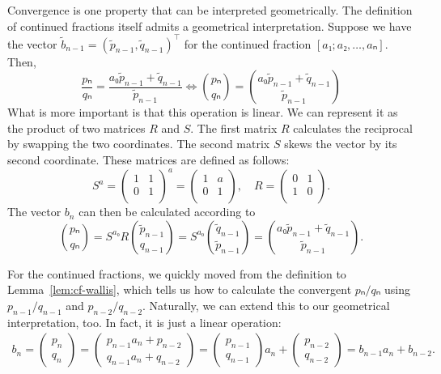 Convergence is one property that can be interpreted geometrically.
The definition of continued fractions itself admits a geometrical interpretation.
Suppose we have the vector $\tilde b_{n-1} = (\tilde p_{n-1}, \tilde q_{n-1})^⊤$
for the continued fraction $[a₁; a₂, …, aₙ]$.
Then,
\[
  \frac{pₙ}{qₙ}
  = \frac{a₀ \tilde p_{n-1} + \tilde q_{n-1}}{\tilde p_{n-1}}
  \iff
  \binom{pₙ}{qₙ}
  = \binom{a₀ \tilde p_{n-1} + \tilde q_{n-1}}{\tilde p_{n-1}}
\]
What is more important is that this operation is linear.
We can represent it as the product of two matrices $R$ and $S$.
The first matrix $R$ calculates the reciprocal by swapping the two coordinates.
The second matrix $S$ skews the vector by its second coordinate.
These matrices are defined as follows:
\[
  S^a =
  \begin{pmatrix}
    1 & 1 \\
    0 & 1 \\
  \end{pmatrix}^a
  =
  \begin{pmatrix}
    1 & a \\
    0 & 1 \\
  \end{pmatrix},
  \quad
  R =
  \begin{pmatrix}
    0 & 1 \\
    1 & 0 \\
  \end{pmatrix}.
\]
The vector $b_n$ can then be calculated according to
\[
  \binom{pₙ}{qₙ}
  = S^{a₀} R \binom{\tilde p_{n-1}}{q_{n-1}}
  = S^{a₀} \binom{\tilde q_{n-1}}{\tilde p_{n-1}}
  = \binom{a₀ \tilde p_{n-1} + \tilde q_{n-1}}{\tilde p_{n-1}}.
\]

For the continued fractions, we quickly moved from the definition to Lemma~\ref{lem:cf-wallis},
which tells us how to calculate the convergent $pₙ/qₙ$ using $p_{n-1}/q_{n-1}$ and $p_{n-2}/q_{n-2}$.
Naturally, we can extend this to our geometrical interpretation, too.
In fact, it is just a linear operation:
\begin{align*}
  b_n =
  \begin{pmatrix}
    p_n \\ q_n
  \end{pmatrix}
  =
  \begin{pmatrix}
    p_{n-1} a_n + p_{n-2} \\ q_{n-1} a_n + q_{n-2}
  \end{pmatrix}
  =
  \begin{pmatrix}
    p_{n-1} \\ q_{n-1}
  \end{pmatrix}
  a_n
  +
  \begin{pmatrix}
    p_{n-2} \\ q_{n-2}
  \end{pmatrix}
  = b_{n-1} a_n + b_{n-2}.
\end{align*}

